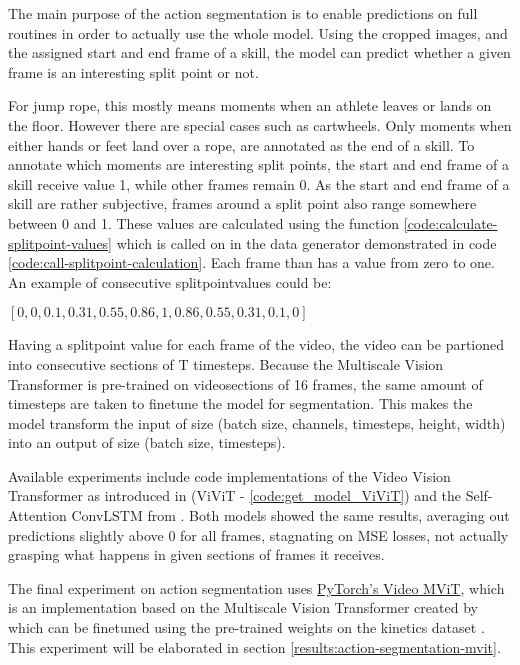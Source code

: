 The main purpose of the action segmentation is to enable predictions on full routines in order to actually use the whole model. Using the cropped images, and the assigned start and end frame of a skill, the model can predict whether a given frame is an interesting split point or not.

For jump rope, this mostly means moments when an athlete leaves or lands on the floor. However there are special cases such as cartwheels. Only moments when either hands or feet land over a rope, are annotated as the end of a skill. 
To annotate which moments are interesting split points, the start and end frame of a skill receive value 1, while other frames remain 0.
As the start and end frame of a skill are rather subjective, frames around a split point also range somewhere between 0 and 1. These values are calculated using the function \ref{code:calculate-splitpoint-values} which is called on in the data generator demonstrated in code \ref{code:call-splitpoint-calculation}.
Each frame than has a value from zero to one. An example of consecutive splitpointvalues could be:

\([0, 0, 0.1, 0.31, 0.55, 0.86, 1, 0.86, 0.55, 0.31, 0.1, 0]\)

Having a splitpoint value for each frame of the video, the video can be partioned into consecutive sections of T timesteps. Because the Multiscale Vision Transformer is pre-trained on videosections of 16 frames, the same amount of timesteps are taken to finetune the model for segmentation. This makes the model transform the input of size (batch size, channels, timesteps, height, width) into an output of size (batch size, timesteps).

Available experiments include code implementations of the Video Vision Transformer as introduced in \textcite{Arnab2021} (ViViT - \ref{code:get_model_ViViT}) and the Self-Attention ConvLSTM from \textcite{Lin_2020}. Both models showed the same results, averaging out predictions slightly above 0 for all frames, stagnating on MSE losses, not actually grasping what happens in given sections of frames it receives.

The final experiment on action segmentation uses \href{https://pytorch.org/vision/main/models/video_mvit.html}{PyTorch's Video MViT}, which is an implementation based on the Multiscale Vision Transformer created by \textcite{Fan2021} which can be finetuned using the pre-trained weights on the kinetics dataset \autocite{Kay2017}. This experiment will be elaborated in section \ref{results:action-segmentation-mvit}.


